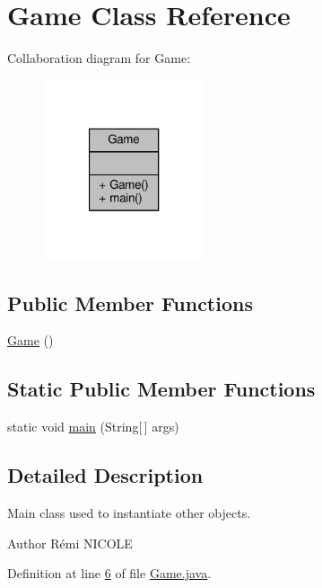 \hypertarget{classGame}{\section{Game Class Reference}
\label{classGame}
}


Collaboration diagram for Game\-:
\nopagebreak
\begin{figure}[H]
\begin{center}
\leavevmode
\includegraphics[width=136pt]{classGame__coll__graph}
\end{center}
\end{figure}
\subsection*{Public Member Functions}
\begin{DoxyCompactItemize}
\item 
\hyperlink{classGame_a2e034e53e9c032964ecd2a831b29a616}{Game} ()
\end{DoxyCompactItemize}
\subsection*{Static Public Member Functions}
\begin{DoxyCompactItemize}
\item 
static void \hyperlink{classGame_ae52595a27ac1b327b05db2129ad81fca}{main} (String\mbox{[}$\,$\mbox{]} args)
\end{DoxyCompactItemize}


\subsection{Detailed Description}
Main class used to instantiate other objects. \begin{DoxyAuthor}{Author}
Rémi N\-I\-C\-O\-L\-E 
\end{DoxyAuthor}


Definition at line \hyperlink{Game_8java_source_l00006}{6} of file \hyperlink{Game_8java_source}{Game.\-java}.



